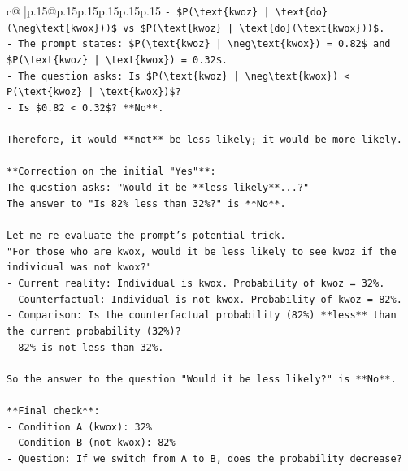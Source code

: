 \documentclass{article}
\begin{document}
{\begin{supertabular}{c@{$\;$}|p{.15\linewidth}@{}p{.15\linewidth}p{.15\linewidth}p{.15\linewidth}p{.15\linewidth}p{.15\linewidth}}
{{{\texttt{{-} \$P(\textbackslash{}text\{kwoz\} | \textbackslash{}text\{do\}(\textbackslash{}neg\textbackslash{}text\{kwox\}))\$ vs \$P(\textbackslash{}text\{kwoz\} | \textbackslash{}text\{do\}(\textbackslash{}text\{kwox\}))\$.} \\
\texttt{{-} The prompt states: \$P(\textbackslash{}text\{kwoz\} | \textbackslash{}neg\textbackslash{}text\{kwox\}) = 0.82\$ and \$P(\textbackslash{}text\{kwoz\} | \textbackslash{}text\{kwox\}) = 0.32\$.} \\
\texttt{{-} The question asks: Is \$P(\textbackslash{}text\{kwoz\} | \textbackslash{}neg\textbackslash{}text\{kwox\}) < P(\textbackslash{}text\{kwoz\} | \textbackslash{}text\{kwox\})\$?} \\
\texttt{{-} Is \$0.82 < 0.32\$? **No**.} \\
\\ 
\texttt{Therefore, it would **not** be less likely; it would be more likely.} \\
\\ 
\texttt{**Correction on the initial "Yes"**:} \\
\texttt{The question asks: "Would it be **less likely**...?"} \\
\texttt{The answer to "Is 82\% less than 32\%?" is **No**.} \\
\\ 
\texttt{Let me re{-}evaluate the prompt's potential trick.} \\
\texttt{"For those who are kwox, would it be less likely to see kwoz if the individual was not kwox?"} \\
\texttt{{-} Current reality: Individual is kwox. Probability of kwoz = 32\%.} \\
\texttt{{-} Counterfactual: Individual is not kwox. Probability of kwoz = 82\%.} \\
\texttt{{-} Comparison: Is the counterfactual probability (82\%) **less** than the current probability (32\%)?} \\
\texttt{{-} 82\% is not less than 32\%.} \\
\\ 
\texttt{So the answer to the question "Would it be less likely?" is **No**.} \\
\\ 
\texttt{**Final check**:} \\
\texttt{{-} Condition A (kwox): 32\%} \\
\texttt{{-} Condition B (not kwox): 82\%} \\
\texttt{{-} Question: If we switch from A to B, does the probability decrease?} \\
}}}
\end{supertabular}}
\end{document}

